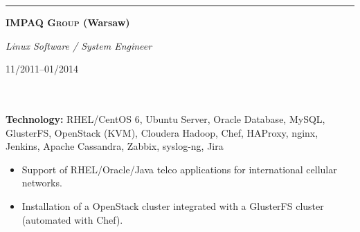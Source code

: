 \documentclass[$fontsize$, a4paper]{article}
\newcommand\textbox[1]{%
  \parbox{.333\textwidth}{#1}%
}
\newcommand{\note}[1]{\marginnote{\scriptsize #1}}
\begin{document}
\noindent\rule[0.5ex]{\linewidth}{1pt}

\noindent\textbox{\textbf{\textsc{IMPAQ Group} (Warsaw)}\hfill}\textbox{\hfil \emph{Linux Software / System Engineer}\hfil}\textbox{\hfill 11/2011--01/2014}\\\\
\textbf{Technology:} RHEL/CentOS 6, Ubuntu Server, Oracle Database, MySQL, GlusterFS, OpenStack (KVM), Cloudera Hadoop, Chef, HAProxy, nginx, Jenkins, Apache Cassandra, Zabbix, syslog-ng, Jira

\vspace{10pt}
\begin{itemize}
  \item Support of RHEL/Oracle/Java telco applications for international cellular networks.
  \item Installation of a OpenStack cluster integrated with a GlusterFS cluster (automated with Chef).
\end{itemize}






\end{document}

